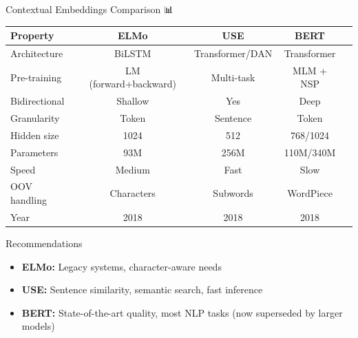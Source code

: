 \documentclass[aspectratio=169]{beamer}
\begin{document}
\begin{frame}{Contextual Embeddings Comparison 📊}
\begin{center}
\begin{tabular}{lcccc}
\toprule
\textbf{Property} & \textbf{ELMo} & \textbf{USE} & \textbf{BERT} \\
\midrule
Architecture & BiLSTM & Transformer/DAN & Transformer \\
Pre-training & LM (forward+backward) & Multi-task & MLM + NSP \\
Bidirectional & Shallow & Yes & Deep \\
Granularity & Token & Sentence & Token \\
Hidden size & 1024 & 512 & 768/1024 \\
Parameters & 93M & 256M & 110M/340M \\
Speed & Medium & Fast & Slow \\
OOV handling & Characters & Subwords & WordPiece \\
Year & 2018 & 2018 & 2018 \\
\bottomrule
\end{tabular}
\end{center}

\vspace{1em}

\begin{block}{Recommendations}
\begin{itemize}\setlength{\itemsep}{0pt}
    \item \textbf{ELMo:} Legacy systems, character-aware needs
    \item \textbf{USE:} Sentence similarity, semantic search, fast inference
    \item \textbf{BERT:} State-of-the-art quality, most NLP tasks (now superseded by larger models)
\end{itemize}
\end{block}
\end{frame}
\end{document}

